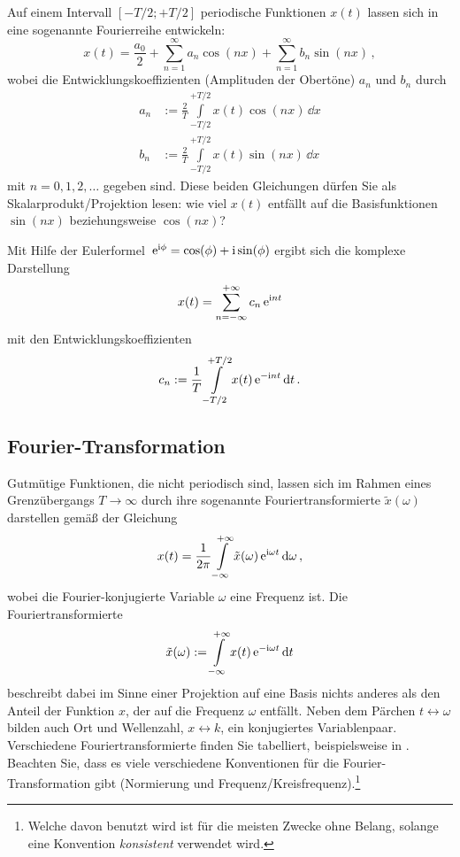 \documentclass[paper=a4, fontsize=11.0pt, abstractoff, DIV12]{scrartcl}
\begin{document}
Auf einem Intervall $[-T/2; +T/2]$ periodische Funktionen $x(t)$
lassen sich in eine sogenannte Fourierreihe entwickeln:
\begin{equation}
x(t) = \frac{a_0}{2}+\sum\limits_{n=1}^{\infty}a_n\cos(nx) + \sum\limits_{n=1}^{\infty}b_n\sin(nx)\,,
\end{equation}
wobei die Entwicklungskoeffizienten (Amplituden der \glqq Obertöne\grqq)
$a_n$ und $b_n$ durch
\begin{align}
a_n &:= \frac{2}{T}\int\limits_{-T/2}^{+T/2}x(t)\cos(nx)\,\dd x\\
b_n &:= \frac{2}{T}\int\limits_{-T/2}^{+T/2}x(t)\sin(nx)\,\dd x
\end{align}
mit $n=0,1,2,\dots$ gegeben sind. Diese beiden Gleichungen dürfen Sie als
Skalarprodukt/Projektion lesen: \glqq wie viel $x(t)$ entfällt auf die
Basisfunktionen $\sin(nx)$ beziehungsweise $\cos(nx)$?\grqq

Mit Hilfe der Eulerformel $\,{\mathrm{e}}^{\mathrm{i}\phi}=\cos(\phi)+\mathrm{i}\sin(\phi)$ ergibt
sich die komplexe Darstellung
\begin{equation}
x(t) = \sum\limits_{n=-\infty}^{+\infty}c_n\,{\mathrm{e}}^{\mathrm{i} n t}
\end{equation}
mit den Entwicklungskoeffizienten
\begin{equation}
c_n := \frac{1}{T}\int\limits_{-T/2}^{+T/2}x(t)\,{\mathrm{e}}^{-\mathrm{i} n t}\,\mathrm{d} t\,.
\end{equation}

\subsection{Fourier-Transformation}

Gutmütige Funktionen, die nicht periodisch sind, lassen sich im Rahmen eines
Grenzübergangs $T\to\infty$ durch ihre sogenannte Fouriertransformierte
$\tilde x(\omega)$ darstellen gemäß der Gleichung
\begin{equation}
x(t) = \frac{1}{2\pi}\int\limits_{-\infty}^{+\infty} \tilde x(\omega) \,{\mathrm{e}}^{\mathrm{i} \omega t}\,\mathrm{d}\omega\,,
\label{eq:IFT}
\end{equation}
wobei die Fourier-konjugierte Variable $\omega$ eine Frequenz ist. Die
Fouriertransformierte
\begin{equation}
\tilde x(\omega) := \int\limits_{-\infty}^{+\infty}x(t) \,{\mathrm{e}}^{-\mathrm{i} \omega t}\,\mathrm{d} t
\label{eq:FT}
\end{equation}
beschreibt dabei im Sinne einer Projektion auf eine Basis nichts anderes als
den Anteil der Funktion $x$, der auf die Frequenz $\omega$ entfällt. Neben
dem Pärchen $t \leftrightarrow \omega$ bilden auch Ort und Wellenzahl, $x
\leftrightarrow k$, ein konjugiertes Variablenpaar. Verschiedene
Fouriertransformierte finden Sie tabelliert, beispielsweise in \cite
{Gradshteyn}. Beachten Sie, dass es viele verschiedene Konventionen für die
Fourier-Transformation gibt (Normierung und Frequenz/Kreisfrequenz).\footnote
{Welche davon benutzt wird ist für die meisten Zwecke ohne Belang,
solange eine Konvention \emph{konsistent} verwendet wird.}
\end{document}
